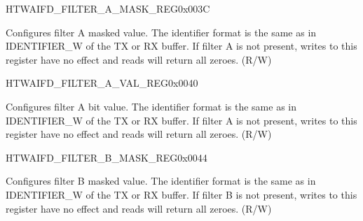 \begin{register}{H}{TWAIFD\_FILTER\_A\_MASK\_REG}{0x003C}\label{regdesc:TWAIFDFILTERAMASKREG}
%
%
\regnewline%
\begin{regdesc}\begin{reglist}
\label{fielddesc:TWAIFDBITMASKAVAL}\item [TWAIFD\_BIT\_MASK\_A\_VAL] Configures filter A masked value. The identifier format is the same as in IDENTIFIER\_W of the TX or RX buffer. If filter A is not present, writes to this register have no effect and reads will return all zeroes. (R/W)
\end{reglist}\end{regdesc}
\end{register}


\begin{register}{H}{TWAIFD\_FILTER\_A\_VAL\_REG}{0x0040}\label{regdesc:TWAIFDFILTERAVALREG}
%
%
\regnewline%
\begin{regdesc}\begin{reglist}
\label{fielddesc:TWAIFDBITVALAVAL}\item [TWAIFD\_BIT\_VAL\_A\_VAL] Configures filter A bit value. The identifier format is the same as in IDENTIFIER\_W of the TX or RX buffer. If filter A is not present, writes to this register have no effect and reads will return all zeroes. (R/W)
\end{reglist}\end{regdesc}
\end{register}


\begin{register}{H}{TWAIFD\_FILTER\_B\_MASK\_REG}{0x0044}\label{regdesc:TWAIFDFILTERBMASKREG}
%
%
\regnewline%
\begin{regdesc}\begin{reglist}
\label{fielddesc:TWAIFDBITMASKBVAL}\item [TWAIFD\_BIT\_MASK\_B\_VAL] Configures filter B masked value. The identifier format is the same as in IDENTIFIER\_W of the TX or RX buffer. If filter B is not present, writes to this register have no effect and reads will return all zeroes. (R/W)
\end{reglist}\end{regdesc}
\end{register}


